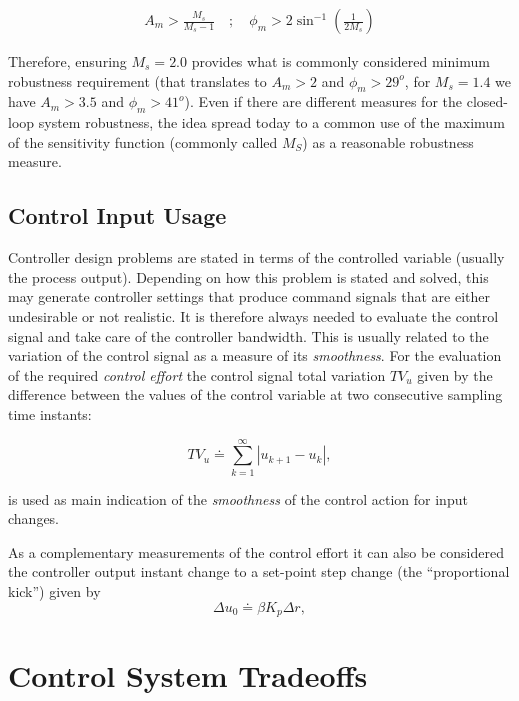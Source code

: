 \begin{eqnarray*}
    A_m > \frac{M_s}{M_s-1} \quad ; \quad \phi_m > 2 \sin^{-1} \left(\frac{1}{2 M_s} \right)
\end{eqnarray*}

Therefore, ensuring $M_s=2.0$ provides what is commonly considered minimum robustness requirement (that translates to $A_m> 2$ and $\phi_m > 29^o$, for $M_s=1.4$  we have $A_m > 3.5$ and $\phi_m > 41^o$). Even if there are different measures for the closed-loop system robustness, the idea spread today to a common use of the maximum of the sensitivity function (commonly called $M_S$) as a reasonable robustness measure.


\subsection{Control Input Usage}

Controller design problems are stated in terms of the controlled variable (usually the process output). Depending on how this problem is stated and solved, this may generate controller settings that produce command signals that are either undesirable or not realistic. It is therefore always needed to evaluate the control signal and take care of the controller bandwidth. This is usually related to the variation of the control signal as a measure of its \emph{smoothness}. For the evaluation of the required \emph{control effort} the control signal total variation $TV_u$ given by the difference between the values of the control variable at two consecutive sampling time instants:

\begin{equation}
	TV_u \doteq \sum^{\infty}_{k=1} \left|u_{k+1} - u_k \right|,  \label{eq:p02}
\end{equation}

\noindent is used as main indication of the \emph{smoothness} of the control action for input changes.

As a complementary measurements of the control effort it can also be considered the controller output instant change to a set-point step change (the ``proportional kick'') given by
\begin{equation}
	\Delta u_0 \doteq \beta K_p \Delta r, \label{eq:p02du}
\end{equation}


\section{Control System Tradeoffs}


